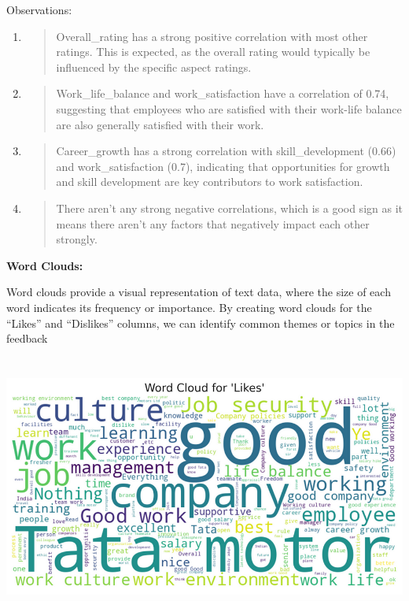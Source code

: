 \documentclass[
]{article}
\begin{document}
Observations:

\begin{enumerate}
\def\labelenumi{\arabic{enumi}.}
\item
  \begin{quote}
  Overall\_rating has a strong positive correlation with most other
  ratings. This is expected, as the overall rating would typically be
  influenced by the specific aspect ratings.
  \end{quote}
\item
  \begin{quote}
  Work\_life\_balance and work\_satisfaction have a correlation of 0.74,
  suggesting that employees who are satisfied with their work-life
  balance are also generally satisfied with their work.
  \end{quote}
\item
  \begin{quote}
  Career\_growth has a strong correlation with skill\_development (0.66)
  and work\_satisfaction (0.7), indicating that opportunities for growth
  and skill development are key contributors to work satisfaction.
  \end{quote}
\item
  \begin{quote}
  There aren't any strong negative correlations, which is a good sign as
  it means there aren't any factors that negatively impact each other
  strongly.
  \end{quote}
\end{enumerate}

\textbf{Word Clouds:}

Word clouds provide a visual representation of text data, where the size
of each word indicates its frequency or importance. By creating word
clouds for the ``Likes'' and ``Dislikes'' columns, we can identify
common themes or topics in the feedback

\includegraphics[width=5.26806in,height=3.41667in]{image6.png}
\end{document}
